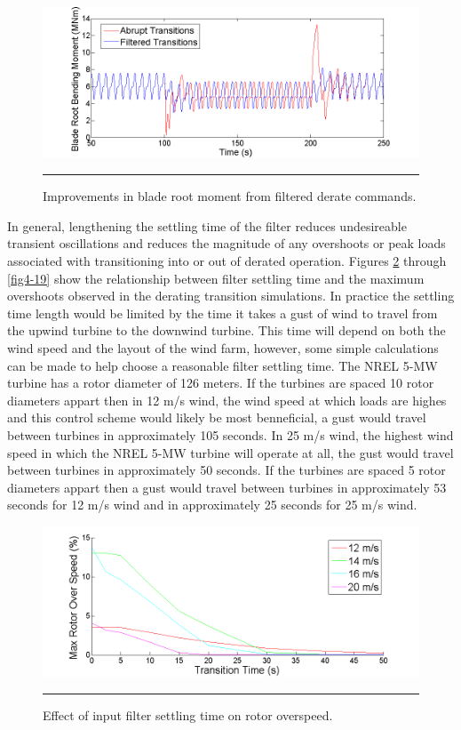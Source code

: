 \begin{figure}[htbp]
	\centering
		\includegraphics[trim = {1cm 0 2cm 0}, clip, width = \linewidth]{Figures/ch4Figures/fig4-16.png}
		\rule{35em}{0.5pt}
	\caption{Improvements in blade root moment from filtered derate commands.}
	\label{fig4-16}
\end{figure}


In general, lengthening the settling time of the filter reduces undesireable transient oscillations and reduces the magnitude of any overshoots or peak loads associated with transitioning into or out of derated operation. Figures \ref{fig4-17} through \ref{fig4-19} show the relationship between filter settling time and the maximum overshoots observed in the derating transition simulations. In practice the settling time length would be limited by the time it takes a gust of wind to travel from the upwind turbine to the downwind turbine. This time will depend on both the wind speed and the layout of the wind farm, however, some simple calculations can be made to help choose a reasonable filter settling time. The NREL 5-MW turbine has a rotor diameter of 126 meters. If the turbines are spaced 10 rotor diameters appart then in 12 m/s wind, the wind speed at which loads are highes and this control scheme would likely be most benneficial, a gust would travel between turbines in approximately 105 seconds. In 25 m/s wind, the highest wind speed in which the NREL 5-MW turbine will operate at all, the gust would travel between turbines in approximately 50 seconds. If the turbines are spaced 5 rotor diameters appart then a gust would travel between turbines in approximately 53 seconds for 12 m/s wind and in approximately 25 seconds for 25 m/s wind. 


\begin{figure}[htbp]
	\centering
		\includegraphics[trim = {1cm 0 2cm 0}, clip, width = \linewidth]{Figures/ch4Figures/fig4-17.png}
		\rule{35em}{0.5pt}
	\caption{Effect of input filter settling time on rotor overspeed.}
	\label{fig4-17}
\end{figure}

